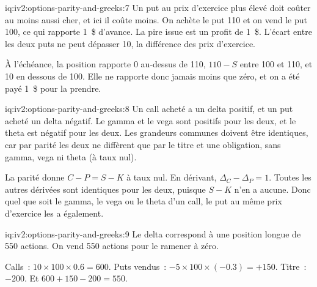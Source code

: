 \begin{solution}{iq:iv2:options-parity-and-greeks:7}
Un put au prix d'exercice plus élevé doit coûter au moins aussi cher, et ici il coûte moins. On achète le put 110 et on vend le put 100, ce qui rapporte 1~\$ d'avance. La pire issue est un profit de 1~\$. L'écart entre les deux puts ne peut dépasser 10, la différence des prix d'exercice.

À l'échéance, la position rapporte 0 au-dessus de 110, $110 - S$ entre 100 et 110, et 10 en dessous de 100. Elle ne rapporte donc jamais moins que zéro, et on a été payé 1~\$ pour la prendre.

\end{solution}

\begin{solution}{iq:iv2:options-parity-and-greeks:8}
Un call acheté a un delta positif, et un put acheté un delta négatif. Le gamma et le vega sont positifs pour les deux, et le theta est négatif pour les deux. Les grandeurs communes doivent être identiques, car par parité les deux ne diffèrent que par le titre et une obligation, sans gamma, vega ni theta (à taux nul).

La parité donne $C - P = S - K$ à taux nul. En dérivant, $\Delta_C - \Delta_P = 1$. Toutes les autres dérivées sont identiques pour les deux, puisque $S - K$ n'en a aucune. Donc quel que soit le gamma, le vega ou le theta d'un call, le put au même prix d'exercice les a également.

\end{solution}

\begin{solution}{iq:iv2:options-parity-and-greeks:9}
Le delta correspond à une position longue de 550 actions. On vend 550 actions pour le ramener à zéro.

Calls~: $10 \times 100 \times 0.6 = 600$. Puts vendus~: $-5 \times 100 \times (-0.3) = +150$. Titre~: $-200$. Et $600 + 150 - 200 = 550$.

\end{solution}

